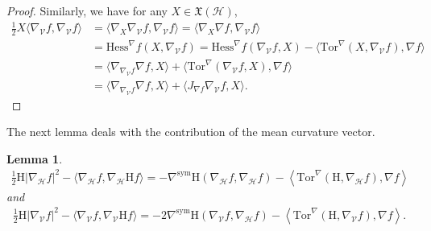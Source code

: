 \documentclass[11pt]{article}
\numberwithin{equation}{section}
\newtheorem{lemma}[theorem]{Lemma}
\newcommand{\Ho}{\mathcal H}
\newcommand{\V}{\mathcal V}
\begin{document}
\begin{proof}
		Similarly, we have for any $X\in \mathfrak{X} (\mathcal{H})$,
		\begin{align*}
			\frac{1}{2}X\langle \nabla_\mathcal{V}f, \nabla_\mathcal{V}f\rangle&= \langle \nabla_X \nabla_\mathcal{V}f ,\nabla_\mathcal{V}f\rangle =\langle \nabla_X \nabla f ,\nabla_\mathcal{V}f\rangle\\
			&=\mathrm{Hess}^{\nabla}f(X, \nabla_{\mathcal{V}} f)=\mathrm{Hess}^{\nabla}f( \nabla_{\mathcal{V}} f, X)-\langle \mathrm{Tor}^{\nabla}(X, \nabla_{\mathcal{V}} f), \nabla f\rangle \\
			&=\langle \nabla_{\nabla_\mathcal{V}f} \nabla f , X\rangle+\langle \mathrm{Tor}^{\nabla}( \nabla_{\mathcal{V}} f, X),\nabla f\rangle \\
			&=\langle \nabla_{\nabla_\mathcal{V}f} \nabla f , X\rangle+\langle J_{\nabla f}\nabla_\mathcal{V}f, X \rangle.
		\end{align*}		
	\end{proof}
	The next lemma deals with the contribution of the mean curvature vector.
    \begin{lemma}\label{mean curvature part}
\begin{align*}
			\frac{1}{2}\mathrm H | \nabla_\Ho f|^2-\langle \nabla_{\mathcal{H}} f , \nabla_{\mathcal{H}} \mathrm H f \rangle=- \nabla^{\mathrm{sym}}\mathrm H(\nabla_\Ho f,\nabla_\Ho f)-\left\langle \mathrm{Tor}^\nabla (\mathrm H, \nabla_\Ho f), \nabla f \right\rangle 
		\end{align*}
		and
		\begin{align*}
			\frac{1}{2}\mathrm H | \nabla_\V f|^2-\langle \nabla_{\mathcal{V}} f , \nabla_{\mathcal{V}}\mathrm H f \rangle=-2\nabla^{\mathrm{sym}}\mathrm H(\nabla_\V f,\nabla_\Ho f)-\left\langle \mathrm{Tor}^\nabla (\mathrm H, \nabla_\V f), \nabla f \right\rangle.
		\end{align*}
    \end{lemma}
\end{document}
